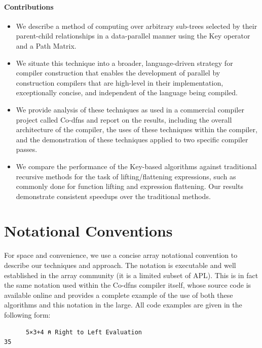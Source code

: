 ﻿\documentclass[numbers,10pt,preprint]{sigplanconf}
\begin{document}
\paragraph{Contributions}

\begin{itemize}[noitemsep]

\item We describe a method of computing over arbitrary sub-trees selected by their parent-child relationships in a data-parallel manner using the Key operator and a Path Matrix.

\item We situate this technique into a broader, language-driven strategy for compiler construction that enables the development of parallel by construction compilers that are high-level in their implementation, exceptionally concise, and independent of the language being compiled.

\item We provide analysis of these techniques as used in a commercial compiler project called Co-dfns and report on the results, including the overall architecture of the compiler, the uses of these techniques within the compiler, and the demonstration of these techniques applied to two specific compiler passes.

\item We compare the performance of the Key-based algorithms against traditional recursive methods for the task of lifting/flattening expressions, such as commonly done for function lifting and expression flattening. Our results demonstrate consistent speedups over the traditional methods.

\end{itemize}

\section{Notational Conventions}

For space and convenience, we use a concise array notational convention to describe our techniques and approach. The notation is executable and well established in the array community (it is a limited subset of APL). This is in fact the same notation used within the Co-dfns compiler itself, whose source code is available online and provides a complete example of the use of both these algorithms and this notation in the large. All code examples are given in the following form:

\begin{verbatim}
      5×3+4 ⍝ Right to Left Evaluation
35
\end{verbatim}
\end{document}
